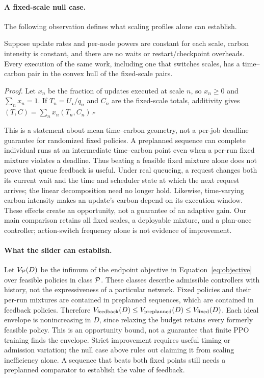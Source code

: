 \paragraph{A fixed-scale null case.}
The following observation defines what scaling profiles alone can establish.

\begin{proposition}
\label{prop:hull}
Suppose update rates and per-node powers are constant for each scale, carbon
intensity is constant, and there are no waits or restart/checkpoint overheads.
Every execution of the same work, including one that switches scales, has a
time--carbon pair in the convex hull of the fixed-scale pairs.
\end{proposition}
\noindent\emph{Proof.}
Let $x_n$ be the fraction of updates executed at scale $n$, so
$x_n\geq0$ and $\sum_nx_n=1$. If $T_n=U_\star/q_n$ and $C_n$ are the
fixed-scale totals, additivity gives
$(T,C)=\sum_nx_n(T_n,C_n)$.\hfill$\square$

This is a statement about mean time--carbon geometry, not a per-job deadline
guarantee for randomized fixed policies. A preplanned sequence can complete
individual runs at an intermediate time--carbon point even when a per-run
fixed mixture violates a deadline. Thus beating a feasible fixed mixture
alone does not prove that queue feedback is useful. Under real queueing, a request changes
both its current wait and the time and scheduler state at which the next
request arrives; the linear decomposition need no longer hold. Likewise,
time-varying carbon intensity makes an update's carbon depend on its execution
window. These effects create an opportunity, not a guarantee of an adaptive
gain. Our main comparison retains all fixed scales, a deployable mixture,
and a plan-once controller; action-switch frequency alone is not evidence
of improvement.

\paragraph{What the slider can establish.}
Let $V_{\cal P}(D)$ be the infimum of the endpoint objective in
Equation~\ref{eq:objective} over feasible policies in class $\cal P$. These classes describe admissible
controllers with history, not the expressiveness of a particular network.
Fixed policies and their per-run mixtures are contained in preplanned
sequences, which are contained in feedback policies. Therefore
$V_{\rm feedback}(D)\leq V_{\rm preplanned}(D)\leq V_{\rm fixed}(D)$.
Each ideal envelope is nonincreasing in $D$, since relaxing the budget retains
every formerly feasible policy. This is an opportunity bound, not a guarantee
that finite PPO training finds the envelope. Strict improvement requires
useful timing or admission variation; the null case above rules out claiming
it from scaling inefficiency alone. A sequence that beats both fixed points
still needs a preplanned comparator to establish the value of feedback.

